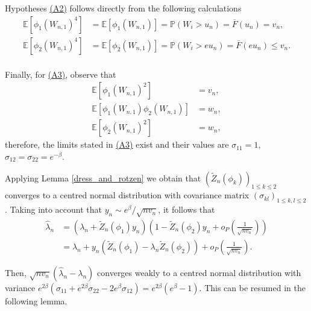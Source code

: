 \documentclass[sn-mathphys-ay]{sn-jnl}%
\renewcommand{\P}{\mathbb{P}}
\newcommand{\E}{\mathbb{E}}
\newcommand{\AssumpATwoText}{(A2)}
\newcommand{\AssumpATwo}{\hyperref[assumpt:AssumpATwo]{\AssumpATwoText}}
\newcommand{\AssumpAThreeText}{(A3)}
\newcommand{\AssumpAThree}{\hyperref[assumpt:AssumpAThree]{\AssumpAThreeText}}
\begin{document}
\begin{appendices}
Hypotheses {\AssumpATwo} follows directly from the following calculations
\begin{align*}
    \E \left[ \phi_1(W_{n,1})^4  \right] & = \E \left[ \phi_1(W_{n,1})\right]=\P\left( W_i>u_n \right)=\overline{F}(u_n)=v_n,         \\
    \E \left[ \phi_2(W_{n,1})^4  \right] & = \E \left[ \phi_2(W_{n,1})\right]=\P\left( W_i>e u_n \right)=\overline{F}(e u_n)\leq v_n. \\
\end{align*}

Finally, for {\AssumpAThree}, observe that
\begin{align*}
    \E\left[ {{\phi _1}\left( {{W_{n,1}}} \right)^2} \right]                                  & = v_n, \\
    \E\left[ {{\phi _1}\left( {{W_{n,1}}} \right){\phi _2}\left( {{W_{n,1}}} \right)} \right] & = w_n, \\
    \E\left[ {{\phi _2}\left( {{W_{n,1}}}\right)^2} \right]                                   & = w_n,
\end{align*}
therefore, the limits stated in {\AssumpAThree} exist and their values are \(\sigma_{11}=1\), \(\sigma _{12}=\sigma _{22}=e^{-\beta}\).

Applying Lemma \ref{dress_and_rotzen} we obtain that \({( {\widetilde {{Z}}_n\left(
                {{\phi _k}} \right)} )_{1 \leqslant k \leqslant 2}}\) converges to a centred normal
distribution with covariance matrix \({\left( {{\sigma _{kl}}} \right)_{1 \leqslant
            k,l \leqslant 2}}\). Taking into account that \({y_n}\sim{{{e^\beta }}}/{{\sqrt
        {n{v_n}} }}\), it follows that
\begin{align}
    {\widehat \lambda _n} & = \left( {{\lambda _n} + {{\widetilde Z}_n}\left( {{\phi _1}} \right){y_n}} \right)\left( {1 - {{\widetilde Z}_n}\left( {{\phi _2}} \right){y_n} + o_P\left( {\frac{1}{{\sqrt {n{v_n}} }}} \right)} \right)\nonumber        \\
                          & = {\lambda _n} + {y_n}\left( {{{\widetilde Z}_n}\left( {{\phi _1}} \right) - {\lambda _n}{{\widetilde Z}_n}\left( {{\phi _2}} \right)} \right) + {o_P}\left( {\frac{1}{{\sqrt {n{v_n}} }}} \right).\label{eq:linearization}
\end{align}

Then, \(\sqrt {n{v_n}} ( {{{\widehat \lambda }_n} - {\lambda _n}} )\) converges
weakly to a centred normal distribution with variance \({e^{2\beta} }\left( {{\sigma
        _{11}} + {e^{2\beta }}{\sigma _{22}} - 2{e^\beta }{\sigma _{12}}} \right) =
    {e^{2\beta }}\left( {{e^\beta } - 1} \right)\). This can be resumed in the following
lemma.


\end{appendices}
\end{document}
